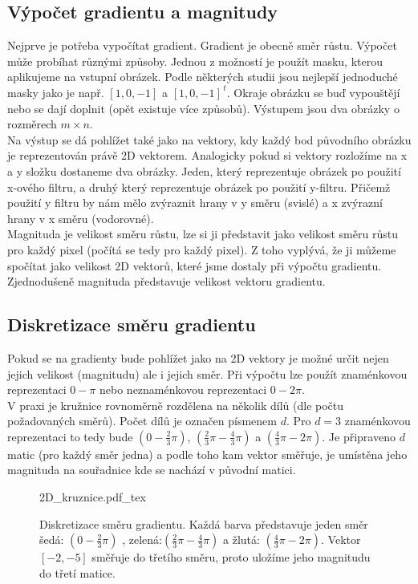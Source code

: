 \documentclass[czech,BP]{thesiskiv}
\begin{document}
\subsection{Výpočet gradientu a magnitudy}
Nejprve je potřeba vypočítat gradient. Gradient je obecně směr růstu. Výpočet může probíhat různými způsoby. Jednou z možností je použít masku, kterou aplikujeme na vstupní obrázek. Podle některých studii jsou nejlepší jednoduché masky jako je např. $[1, 0, -1]$ a $[1, 0, -1]^{\,t}$. Okraje obrázku se buď vypouštějí nebo se dají doplnit (opět existuje více způsobů). Výstupem jsou dva obrázky o rozměrech $m \times n$. \\
Na výstup se dá pohlížet také jako na vektory, kdy každý bod původního obrázku je reprezentován právě 2D vektorem. Analogicky pokud si vektory rozložíme na x a y složku dostaneme dva obrázky. Jeden, který reprezentuje obrázek po použití x-ového filtru, a druhý který reprezentuje obrázek po použití y-filtru. Přičemž použití y filtru by nám mělo zvýraznit hrany v y směru (svislé) a x zvýrazní hrany v x směru (vodorovné). \\

Magnituda je velikost směru růstu, lze si ji představit jako velikost směru růstu pro každý pixel (počítá se tedy pro každý pixel).  Z toho vyplývá, že ji můžeme spočítat jako velikost 2D vektorů, které jsme dostaly při výpočtu gradientu. Zjednodušeně magnituda představuje velikost vektoru gradientu. \\

\subsection{Diskretizace směru gradientu}
Pokud se na gradienty bude pohlížet jako na 2D vektory je možné určit nejen jejich velikost (magnitudu) ale i jejich směr. Při výpočtu lze použít znaménkovou reprezentaci $0 - \pi$ nebo neznaménkovou reprezentaci $0 - 2\pi$. \\
V praxi je kružnice rovnoměrně rozdělena na několik dílů (dle počtu požadovaných směrů). Počet dílů  je označen písmenem $d$. Pro $d = 3$ znaménkovou reprezentaci to tedy bude $\left(0 - \frac{2}{3}\pi \right)$, $\left(\frac{2}{3}\pi - \frac{4}{3}\pi \right)$ a $\left(\frac{4}{3}\pi - 2\pi \right)$. Je připraveno $d$ matic (pro každý směr jedna) a podle toho kam vektor směřuje, je umístěna jeho magnituda na souřadnice kde se nachází v původní matici. 

\begin{figure}[H]
    \centering    
    \def\svgwidth{230pt}
	{2D_kruznice.pdf_tex}    
    \caption{Diskretizace směru gradientu. Každá barva představuje jeden směr šedá: $\left(0 - \frac{2}{3}\pi \right)$ , zelená:$\left(\frac{2}{3}\pi - \frac{4}{3}\pi \right)$ a žlutá: $\left(\frac{4}{3}\pi - 2\pi \right)$. Vektor $[ -2, -5 ]$ směřuje do třetího směru, proto uložíme jeho magnitudu do třetí matice. }
    \label{fig: 2D_graf}
\end{figure}
\end{document}
